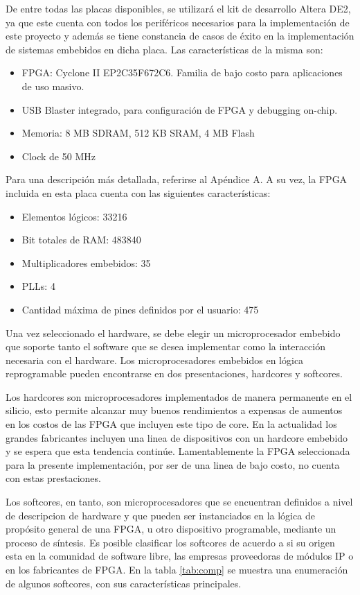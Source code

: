 De entre todas las placas disponibles, se utilizará el ‎kit de desarrollo  Altera DE2, ya que este cuenta con todos los periféricos necesarios para la  implementación de este proyecto y además se tiene constancia de casos de éxito en la implementación de sistemas embebidos en dicha placa. Las características de la misma son:

\begin{itemize}
	\item FPGA: Cyclone II EP2C35F672C6. Familia de bajo costo para aplicaciones de uso masivo.
	\item USB Blaster integrado, para configuración de FPGA y debugging on-chip.
	\item Memoria: 8 MB SDRAM, 512 KB SRAM, 4 MB Flash
	\item Clock de 50 MHz
\end{itemize}

Para una descripción más detallada, referirse al Apéndice A. A su vez, la FPGA incluida en esta placa cuenta con las siguientes características:

\begin{itemize}
	\item Elementos lógicos: 33216
	\item Bit totales de RAM: 483840
	\item Multiplicadores embebidos: 35
	\item PLLs: 4
	\item Cantidad máxima de pines definidos por el usuario: 475
\end{itemize}

Una vez seleccionado el hardware, se debe elegir un microprocesador embebido que soporte tanto el software que se desea implementar como la interacción necesaria con el hardware. Los microprocesadores embebidos en lógica reprogramable pueden encontrarse en dos presentaciones, hardcores y softcores.

Los hardcores son microprocesadores implementados de manera permanente en el silicio, esto permite alcanzar muy buenos rendimientos a expensas de aumentos en los costos de las FPGA que incluyen este tipo de core. En la actualidad los grandes fabricantes incluyen una linea de dispositivos con un hardcore embebido y se espera que esta tendencia continúe. Lamentablemente la FPGA seleccionada para la presente implementación, por ser de una linea de bajo costo, no cuenta con estas prestaciones. 

Los softcores, en tanto, son microprocesadores que se encuentran definidos a nivel de descripcion de hardware y que pueden ser instanciados en la lógica de propósito general de una FPGA, u otro dispositivo programable, mediante un proceso de síntesis. Es posible clasificar los softcores de acuerdo a si su origen esta en la comunidad de software libre, las empresas proveedoras de módulos IP o en los fabricantes de FPGA.  En la tabla \ref{tab:comp} se muestra una enumeración de algunos softcores, con sus características principales. 

